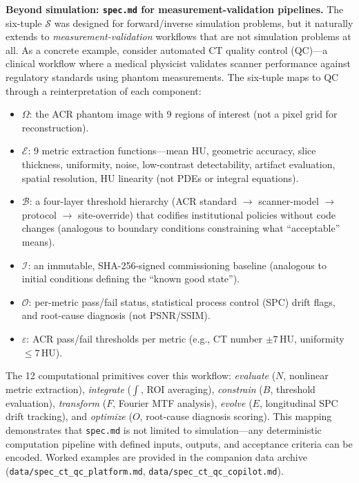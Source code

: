 \documentclass[11pt,a4paper]{article}
\newcommand{\Spec}{\mathcal{S}}
\newcommand{\Domain}{\Omega}
\begin{document}
\textbf{Beyond simulation: \texttt{spec.md} for measurement-validation pipelines.} The six-tuple $\Spec$ was designed for forward/inverse simulation problems, but it naturally extends to \emph{measurement-validation} workflows that are not simulation problems at all. As a concrete example, consider automated CT quality control (QC)---a clinical workflow where a medical physicist validates scanner performance against regulatory standards using phantom measurements. The six-tuple maps to QC through a reinterpretation of each component:
\begin{itemize}[nosep]
\item $\Domain$: the ACR phantom image with 9 regions of interest (not a pixel grid for reconstruction).
\item $\mathcal{E}$: 9 metric extraction functions---mean HU, geometric accuracy, slice thickness, uniformity, noise, low-contrast detectability, artifact evaluation, spatial resolution, HU linearity (not PDEs or integral equations).
\item $\mathcal{B}$: a four-layer threshold hierarchy (ACR standard $\to$ scanner-model $\to$ protocol $\to$ site-override) that codifies institutional policies without code changes (analogous to boundary conditions constraining what ``acceptable'' means).
\item $\mathcal{I}$: an immutable, SHA-256-signed commissioning baseline (analogous to initial conditions defining the ``known good state'').
\item $\mathcal{O}$: per-metric pass/fail status, statistical process control (SPC) drift flags, and root-cause diagnosis (not PSNR/SSIM).
\item $\varepsilon$: ACR pass/fail thresholds per metric (e.g., CT number $\pm 7$\,HU, uniformity $\leq 7$\,HU).
\end{itemize}
The 12 computational primitives cover this workflow: \emph{evaluate} ($N$, nonlinear metric extraction), \emph{integrate} ($\int$, ROI averaging), \emph{constrain} ($B$, threshold evaluation), \emph{transform} ($F$, Fourier MTF analysis), \emph{evolve} ($E$, longitudinal SPC drift tracking), and \emph{optimize} ($O$, root-cause diagnosis scoring). This mapping demonstrates that \texttt{spec.md} is not limited to simulation---any deterministic computation pipeline with defined inputs, outputs, and acceptance criteria can be encoded. Worked examples are provided in the companion data archive (\texttt{data/spec\_ct\_qc\_platform.md}, \texttt{data/spec\_ct\_qc\_copilot.md}).
\end{document}
